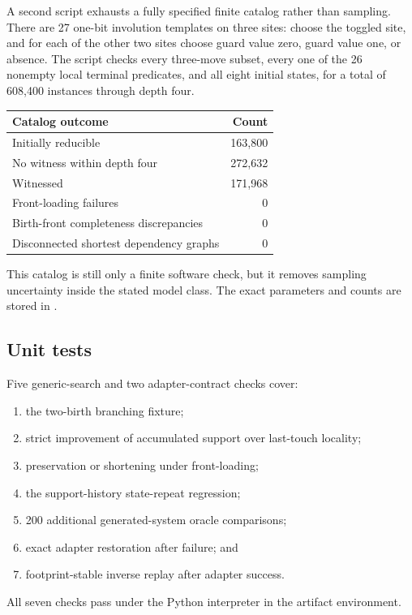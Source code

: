 A second script exhausts a fully specified finite catalog rather than sampling.
There are 27 one-bit involution templates on three sites: choose the toggled
site, and for each of the other two sites choose guard value zero, guard value
one, or absence.  The script checks every three-move subset, every one of the 26
nonempty local terminal predicates, and all eight initial states, for a total of
608,400 instances through depth four.

\begin{center}
\begin{tabular}{@{}lr@{}}
\toprule
Catalog outcome & Count \\
\midrule
Initially reducible & 163,800 \\
No witness within depth four & 272,632 \\
Witnessed & 171,968 \\
Front-loading failures & 0 \\
Birth-front completeness discrepancies & 0 \\
Disconnected shortest dependency graphs & 0 \\
\bottomrule
\end{tabular}
\end{center}

This catalog is still only a finite software check, but it removes sampling
uncertainty inside the stated model class.  The exact parameters and counts are
stored in .

\subsection{Unit tests}

Five generic-search and two adapter-contract checks cover:
\begin{enumerate}
\item the two-birth branching fixture;
\item strict improvement of accumulated support over last-touch locality;
\item preservation or shortening under front-loading;
\item the support-history state-repeat regression;
\item 200 additional generated-system oracle comparisons;
\item exact adapter restoration after failure; and
\item footprint-stable inverse replay after adapter success.
\end{enumerate}
All seven checks pass under the Python interpreter in the artifact environment.

